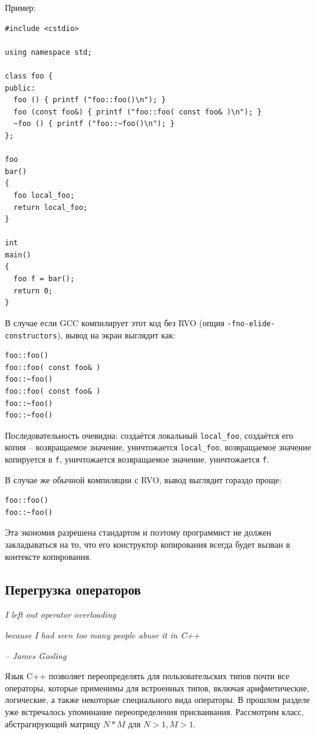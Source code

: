 \documentclass[a4paper,12pt,oneside]{article}
\begin{document}
Пример:

\begin{lstlisting}
#include <cstdio>

using namespace std;

class foo {
public:
  foo () { printf ("foo::foo()\n"); }
  foo (const foo&) { printf ("foo::foo( const foo& )\n"); }
  ~foo () { printf ("foo::~foo()\n"); }
};

foo
bar()
{
  foo local_foo;
  return local_foo;
}

int
main()
{
  foo f = bar();
  return 0;
}
\end{lstlisting}

В случае если GCC компилирует этот код без RVO (опция \lstinline!-fno-elide-constructors!), вывод на экран выглядит как:

\begin{lstlisting}
foo::foo()
foo::foo( const foo& )
foo::~foo()
foo::foo( const foo& )
foo::~foo()
foo::~foo()
\end{lstlisting}

Последовательность очевидна: создаётся локальный \lstinline!local_foo!, создаётся его копия -- возвращаемое значение, уничтожается \lstinline!local_foo!, возвращаемое значение копируется в \lstinline!f!, уничтожается возвращаемое значение, уничтожается \lstinline!f!.

В случае же обычной компиляции с RVO, вывод выглядит гораздо проще:

\begin{lstlisting}
foo::foo()
foo::~foo()
\end{lstlisting}

Эта экономия разрешена стандартом и поэтому программист не должен закладываться на то, что его конструктор копирования всегда будет вызван в контексте копирования.

\pagebreak
\subsection{Перегрузка операторов}\label{OperatorOverloading}

\hfill\textit{I left out operator overloading}

\hfill\textit{because I had seen too many people abuse it in C++}{\vspace{0.5em}}

\hfill\textit{-- James Gosling}

Язык C++ позволяет переопределять для пользовательских типов почти все операторы, которые применимы для встроенных типов, включая арифметические, логические, а также некоторые специального вида операторы. В прошлом разделе уже встречалось упоминание переопределения присваивания. Рассмотрим класс, абстрагирующий матрицу $N*M$ для $N>1, M>1$.
\end{document}
